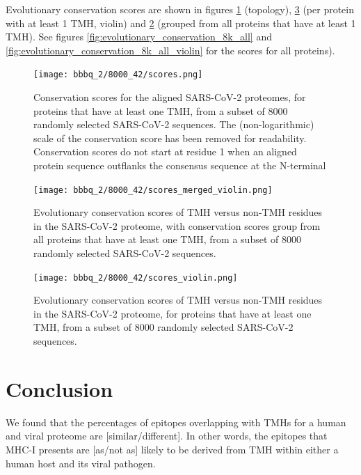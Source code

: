 Evolutionary conservation scores are shown in 
figures \ref{fig:evolutionary_conservation_8k} (topology),
\ref{fig:evolutionary_conservation_8k_violin} (per 
protein with at least 1 TMH, violin)
and \ref{fig:evolutionary_conservation_8k_merged} (grouped 
from all proteins that have at least 1 TMH).
See figures
\ref{fig:evolutionary_conservation_8k_all} and 
\ref{fig:evolutionary_conservation_8k_all_violin}
for the scores for all proteins).


\begin{figure}[!htbp]
  \texttt{[image: bbbq\_2/8000\_42/scores.png]}
  \caption{
    Conservation scores for the aligned SARS-CoV-2 proteomes,
    for proteins that have at least one TMH,
    from a subset of 8000 randomly selected SARS-CoV-2 sequences.
    The (non-logarithmic) scale of the conservation score has been removed
    for readability.
    Conservation scores do not start at residue 1 when
    an aligned protein sequence outflanks the consensus sequence 
    at the N-terminal
  }
  \label{fig:evolutionary_conservation_8k}
\end{figure}

\begin{figure}[!htbp]
  \texttt{[image: bbbq\_2/8000\_42/scores\_merged\_violin.png]}
  \caption{
    Evolutionary conservation scores of TMH versus non-TMH
    residues in the SARS-CoV-2 proteome,
    with conservation scores group from all proteins that have at least one TMH,
    from a subset of 8000 randomly selected SARS-CoV-2 sequences.
  }
  \label{fig:evolutionary_conservation_8k_merged}
\end{figure}

\begin{figure}[!htbp]
  \texttt{[image: bbbq\_2/8000\_42/scores\_violin.png]}
  \caption{
    Evolutionary conservation scores of TMH versus non-TMH
    residues in the SARS-CoV-2 proteome,
    for proteins that have at least one TMH,
    from a subset of 8000 randomly selected SARS-CoV-2 sequences.
  }
  \label{fig:evolutionary_conservation_8k_violin}
\end{figure}

\section{Conclusion}

We found that the percentages of epitopes overlapping 
with TMHs for a human and viral proteome are 
[similar/different]. In other words, the
epitopes that MHC-I presents are [as/not as] likely 
to be derived from TMH within either a human host and its viral pathogen.

